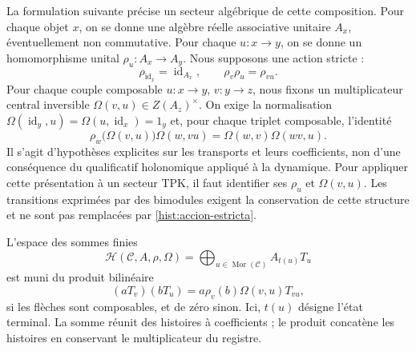 La formulation suivante précise un secteur algébrique de cette composition.
Pour chaque objet \(x\), on se donne une algèbre réelle associative unitaire \(A_x\),
éventuellement non commutative. Pour chaque \(u:x\to y\), on se donne un
homomorphisme unital \(\rho_u:A_x\to A_y\). Nous supposons une action stricte :
\begin{equation}
 \rho_{\operatorname{id}_x}=\operatorname{id}_{A_x},\qquad
 \rho_v\rho_u=\rho_{vu}.
 \label{hist:accion-estricta}
\end{equation}
Pour chaque couple composable \(u:x\to y\), \(v:y\to z\), nous fixons un
multiplicateur central inversible
\(\Omega(v,u)\in Z(A_z)^\times\). On exige la normalisation
\(\Omega(\operatorname{id}_y,u)=\Omega(u,\operatorname{id}_x)=1_y\)
et, pour chaque triplet composable, l’identité
\begin{equation}
 \rho_w\bigl(\Omega(v,u)\bigr)\Omega(w,vu)
   =\Omega(w,v)\Omega(wv,u).
 \label{hist:cociclo}
\end{equation}
Il s’agit d’hypothèses explicites sur les transports et leurs coefficients, non d’une
conséquence du qualificatif holonomique appliqué à la dynamique. Pour appliquer cette présentation
à un secteur TPK, il faut identifier ses \(\rho_u\) et \(\Omega(v,u)\).
Les transitions exprimées par des bimodules exigent la conservation de cette
structure et ne sont pas remplacées par \eqref{hist:accion-estricta}.

L’espace des sommes finies
\[
 \mathcal H(\mathcal C,A,\rho,\Omega)
   =\bigoplus_{u\in\operatorname{Mor}(\mathcal C)} A_{t(u)}T_u
\]
est muni du produit bilinéaire
\begin{equation}
 (aT_v)(bT_u)=a\rho_v(b)\Omega(v,u)T_{vu},
 \label{hist:producto}
\end{equation}
si les flèches sont composables, et de zéro sinon. Ici, \(t(u)\)
désigne l’état terminal. La somme réunit des histoires à coefficients ; le
produit concatène les histoires en conservant le multiplicateur du registre.

